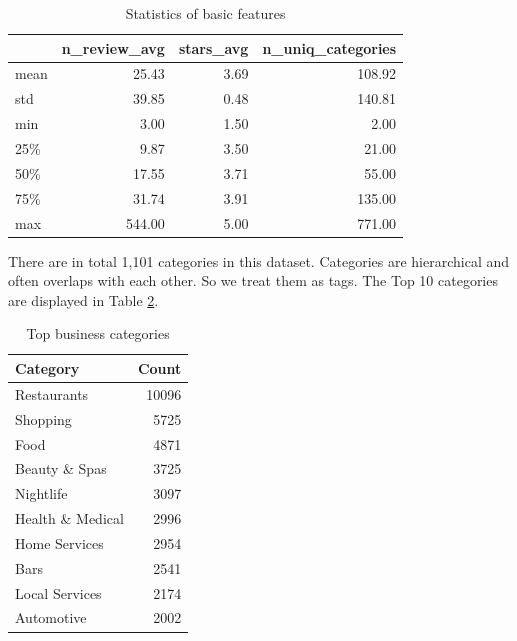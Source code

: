 \documentclass[draftclsnofoot]{IEEEtran}
\let\MYoriglatexcaption\caption
\renewcommand{\caption}[2][\relax]{\MYoriglatexcaption[#2]{#2}}
\begin{document}
\begin{table}[htbp]
\caption{Statistics of basic features}
\label{feature-stats}
\centering
\begin{tabular}{lrrr}
\toprule
{} &  n\_review\_avg &  stars\_avg   &  n\_uniq\_categories \\
\midrule
mean  &             25.43 &       3.69 &          108.92 \\
std   &             39.85 &       0.48 &          140.81 \\
min   &              3.00 &       1.50 &            2.00 \\
25\%   &              9.87 &       3.50 &           21.00 \\
50\%   &             17.55 &       3.71 &           55.00 \\
75\%   &             31.74 &       3.91 &          135.00 \\
max   &            544.00 &       5.00 &          771.00 \\
\bottomrule
\end{tabular}
\end{table}

There are in total 1,101 categories in this dataset. Categories are hierarchical and often overlaps with each other. So we treat them as tags. The Top 10 categories are displayed in Table \ref{top-cats}.

\begin{table}[htbp]
\caption{Top business categories}
\label{top-cats}
\centering
\begin{tabular}{lr}
\toprule
Category &  	Count \\
\midrule
Restaurants      &           10096 \\
Shopping         &            5725 \\
Food             &            4871 \\
Beauty \& Spas    &            3725 \\
Nightlife        &            3097 \\
Health \& Medical &            2996 \\
Home Services    &            2954 \\
Bars             &            2541 \\
Local Services   &            2174 \\
Automotive       &            2002 \\
\bottomrule
\end{tabular}
\end{table}
\end{document}
